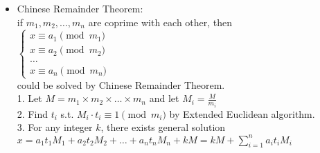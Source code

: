 \begin{itemize}[leftmargin=*]
\setlength\itemsep{0.2em}
\item Chinese Remainder Theorem:\\
if $m_1,m_2,\dots,m_n$ are coprime with each other, then\\
$\begin{cases}x\equiv a_1\pmod{m_1}\\x\equiv a_2\pmod{m_2}\\\dots\\x\equiv a_n\pmod{m_n}\end{cases}$\\
could be solved by Chinese Remainder Theorem.\\
1. Let $M=m_1\times m_2\times\dots\times m_n$ and let $M_i=\frac{M}{m_i}$\\
2. Find $t_i$ s.t. $M_i\cdot t_i\equiv1\pmod{m_i}$ by Extended Euclidean algorithm.\\
3. For any integer $k$, there exists general solution\\
$x=a_1t_1M_1+a_2t_2M_2+\dots+a_nt_nM_n+kM=kM+\sum\limits_{i=1}^na_it_iM_i$

\end{itemize}